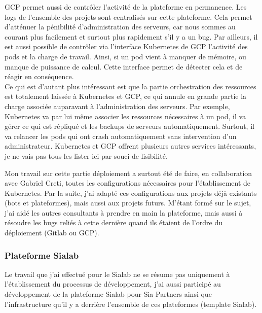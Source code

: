 \documentclass{article} %
\begin{document}
GCP permet aussi de contrôler l'activité de la plateforme en permanence. Les logs de l'ensemble des projets sont centralisés sur cette plateforme. Cela permet d'atténuer la pénibilité d'administration des serveurs, car nous sommes au courant plus facilement et surtout plus rapidement s'il y a un bug. Par ailleurs, il est aussi possible de contrôler via l'interface Kubernetes de GCP l'activité des pods et la charge de travail. Ainsi, si un pod vient à manquer de mémoire, ou manque de puissance de calcul. Cette interface permet de détecter cela et de réagir en conséquence.\\
Ce qui est d'autant plus intéressant est que la partie orchestration des ressources est totalement laissée à Kubernetes et GCP, ce qui annule en grande partie la charge associée auparavant à l'administration des serveurs. Par exemple, Kubernetes va par lui même associer les ressources nécessaires à un pod, il va gérer ce qui est répliqué et les backups de serveurs automatiquement. Surtout, il va relancer les pods qui ont crash automatiquement sans intervention d'un administrateur. Kubernetes et GCP offrent plusieurs autres services intéressants, je ne vais pas tous les lister ici par souci de lisibilité. 


Mon travail sur cette partie déploiement a surtout été de faire, en collaboration avec Gabriel Creti, toutes les configurations nécessaires pour l'établissement de Kubernetes. Par la suite, j'ai adapté ces configurations aux projets déjà existants (bots et plateformes), mais aussi aux projets futurs. M'étant formé sur le sujet, j'ai aidé les autres consultants à prendre en main la plateforme, mais aussi à résoudre les bugs reliés à cette dernière quand ils étaient de l'ordre du déploiement (Gitlab ou GCP). 

\subsubsection{Plateforme Sialab}
Le travail que j'ai effectué pour le Sialab ne se résume pas uniquement à l'établissement du processus de développement, j'ai aussi participé au développement de la plateforme Sialab pour Sia Partners ainsi que l'infrastructure qu'il y a derrière l'ensemble de ces plateformes (template Sialab).\\
\end{document}
